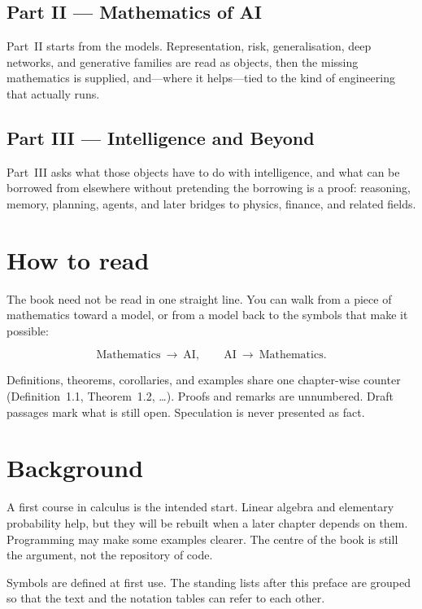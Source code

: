 \subsection*{Part II --- Mathematics of AI}

Part~II starts from the models. Representation, risk, generalisation, deep networks, and generative families are read as objects, then the missing mathematics is supplied, and---where it helps---tied to the kind of engineering that actually runs.

\subsection*{Part III --- Intelligence and Beyond}

Part~III asks what those objects have to do with intelligence, and what can be borrowed from elsewhere without pretending the borrowing is a proof: reasoning, memory, planning, agents, and later bridges to physics, finance, and related fields.

\section*{How to read}

The book need not be read in one straight line. You can walk from a piece of mathematics toward a model, or from a model back to the symbols that make it possible:

\[
\text{Mathematics}\ \rightarrow\ \text{AI},
\qquad
\text{AI}\ \rightarrow\ \text{Mathematics}.
\]

Definitions, theorems, corollaries, and examples share one chapter-wise counter (Definition~1.1, Theorem~1.2, \ldots). Proofs and remarks are unnumbered. Draft passages mark what is still open. Speculation is never presented as fact.

\section*{Background}

A first course in calculus is the intended start. Linear algebra and elementary probability help, but they will be rebuilt when a later chapter depends on them. Programming may make some examples clearer. The centre of the book is still the argument, not the repository of code.

Symbols are defined at first use. The standing lists after this preface are grouped so that the text and the notation tables can refer to each other.

